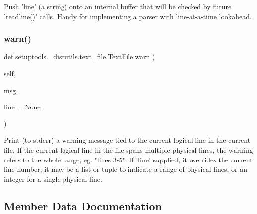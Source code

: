 \begin{DoxyVerb}Push 'line' (a string) onto an internal buffer that will be
   checked by future 'readline()' calls.  Handy for implementing
   a parser with line-at-a-time lookahead.\end{DoxyVerb}
 \mbox{\label{classsetuptools_1_1__distutils_1_1text__file_1_1TextFile_ad1e288f07d9181231045ac5e7e0ae842}} 
\subsubsection{\texorpdfstring{warn()}{warn()}}
{\footnotesize\ttfamily def setuptools.\+\_\+distutils.\+text\+\_\+file.\+Text\+File.\+warn (\begin{DoxyParamCaption}\item[{}]{self,  }\item[{}]{msg,  }\item[{}]{line = {\ttfamily None} }\end{DoxyParamCaption})}

\begin{DoxyVerb}Print (to stderr) a warning message tied to the current logical
   line in the current file.  If the current logical line in the
   file spans multiple physical lines, the warning refers to the
   whole range, eg. "lines 3-5".  If 'line' supplied, it overrides
   the current line number; it may be a list or tuple to indicate a
   range of physical lines, or an integer for a single physical
   line.\end{DoxyVerb}
 

\subsection{Member Data Documentation}
\mbox{\label{classsetuptools_1_1__distutils_1_1text__file_1_1TextFile_a49e7af06d40b2910671c071d1f3cc6dd}} 
